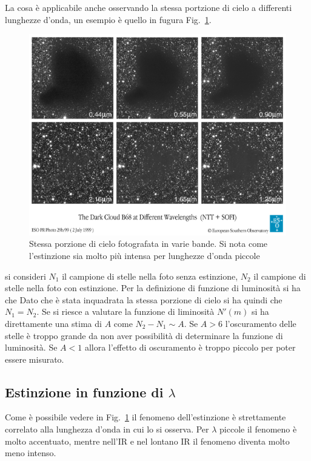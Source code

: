 La cosa \`e applicabile anche osservando la stessa portzione di cielo a differenti lunghezze d'onda, un esempio \`e quello in fugura Fig.~\ref{PHOT:EXTIN}.
\begin{figure}
		\centering
		\includegraphics[scale=1.2]{Estinzione.jpg}
		\caption{Stessa porzione di cielo fotografata in varie bande. Si nota come l'estinzione sia molto pi\`u intensa per lunghezze d'onda piccole}
		\label{PHOT:EXTIN}
\end{figure}
si consideri $N_1$ il campione di stelle nella foto senza estinzione, $N_2$ il campione di stelle nella foto con estinzione. Per la definizione di funzione di luminosit\`a si ha che
Dato che \`e stata inquadrata la stessa porzione di cielo si ha quindi che $N_1 = N_2$. Se si riesce a valutare la funzione di liminosit\`a $N'(m)$ si ha direttamente una stima di $A$ come $N_2 - N_1 \sim A$.
Se $A > 6$ l'oscuramento delle stelle \`e troppo grande da non aver possibilit\`a di determinare la funzione di luminosit\`a. Se $A<1$ allora l'effetto di oscuramento \`e troppo piccolo per poter essere misurato.
\subsection{Estinzione in funzione di $\lambda$}
Come \`e possibile vedere in Fig.~\ref{PHOT:EXTIN} il fenomeno dell'estinzione \`e strettamente correlato alla lunghezza d'onda in cui lo si osserva. Per $\lambda$ piccole il fenomeno \`e molto accentuato, mentre nell'IR e nel lontano IR il fenomeno diventa molto meno intenso.

